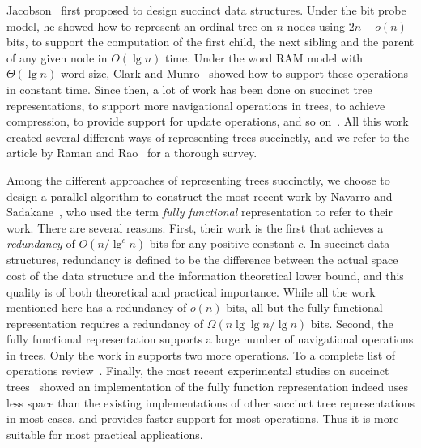 Jacobson~\cite{j1989} first proposed to design succinct data structures. Under the bit probe model, he showed how to represent an ordinal tree on $n$ nodes using $2n+o(n)$ bits, to support the computation of the first child, the next sibling and the parent of any given node in $O(\lg n)$ time. 
Under the word RAM model with $\Theta(\lg n)$ word size, Clark and Munro~\cite{cm1996} showed how to support these operations in constant time. 
Since then, a lot of work has been done on succinct tree representations, to support more navigational operations in trees, to achieve compression, to provide support for update operations, and so on~\cite{mr1997,bdmr1999,grr2004,jss2007,ly2008,hms2012,fm2014,Navarro:2014:FFS:2620785.2601073}. 
All this work created several different ways of representing trees succinctly, and we refer to the article by Raman and Rao~\cite{rr2013} for a thorough survey.

Among the different approaches of representing trees succinctly, we choose to design a parallel algorithm to construct the most recent work by Navarro and Sadakane~\cite{Navarro:2014:FFS:2620785.2601073}, who used the term {\em fully functional} representation to refer to their work. There are several reasons. 
First, their work is the first that achieves a {\em redundancy} of $O(n/\lg^c n)$ bits for any positive constant $c$. 
In succinct data structures, redundancy is defined to be the difference between the actual space cost of the data structure and the information theoretical lower bound, and this quality is of both theoretical and practical importance. 
While all the work mentioned here has a redundancy of $o(n)$ bits, all but the fully functional representation requires a redundancy of $\Omega(n \lg\lg n / \lg n)$ bits. 
Second, the fully functional representation supports a large number of navigational operations in trees. Only the work in \cite{hms2012,fm2014} supports two more operations. To a complete list of operations review~\cite{Navarro:2014:FFS:2620785.2601073}.
%
%
Finally, the most recent experimental studies on succinct trees~\cite{ACNSalenex10} showed an implementation of the fully function representation indeed uses less space than the existing implementations of other succinct tree representations in most cases, and provides faster support for most operations. Thus it is more suitable for most practical applications. 

